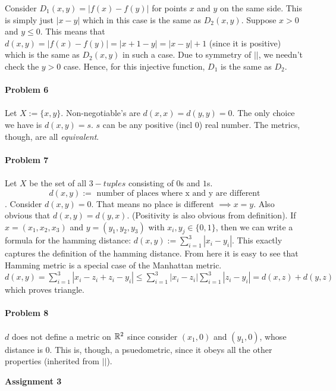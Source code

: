 \documentclass[../Main.tex]{subfiles}
\begin{document}
Consider $D_1(x,y)=|f(x)-f(y)|$ for points $x$ and $y$ on the same side. This is simply just $|x-y|$ which in this case is the same as $D_2(x,y)$. Suppose $x>0$ and $y\leq 0$. This means that $d(x,y)=|f(x)-f(y)|=|x+1-y|=|x-y|+1$ (since it is positive) which is the same as $D_2(x,y)$ in such a case. Due to symmetry of $||$, we needn't check the $y>0$ case. Hence, for this injective function, $D_1$ is the same as $D_2$.
\\\\ \textbf{Problem 6}
\\\\ Let $X:=\{x,y\}$. Non-negotiable's are $d(x,x)=d(y,y)=0$. The only choice we have is $d(x,y)=s$. $s$ can be any positive (incl $0$) real number. The metrics, though, are all \emph{equivalent}.
\\\\ \textbf{Problem 7}
\\\\ Let $X$ be the set of all $3-tuples$ consisting of $0$s and $1$s. $$d(x,y):=\text{ number of places where x and y are different}$$. Consider $d(x,y)=0$. That means no place is different $\implies x=y$. Also obvious that $d(x,y)=d(y,x)$. (Positivity is also obvious from definition). If $x=(x_1,x_2,x_3)$ and $y=(y_1,y_2,y_3)$ with $x_i,y_j\in\{0,1\}$, then we can write a formula for the hamming distance: $d(x,y):= \sum_{i=1}^{3}|x_i-y_i|$. This exactly captures the definition of the hamming distance. From here it is easy to see that Hamming metric is a special case of the Manhattan metric. $d(x,y)=\sum_{i=1}^3|x_i-z_i+z_i-y_i|\leq \sum_{i=1}^3|x_i-z_i| \sum_{i=1}^3 |z_i-y_i|=d(x,z)+d(y,z)$ which proves triangle.
\\\\ \textbf{Problem 8}
\\\\ $d$ does not define a metric on $\mathbb R^2$ since consider $(x_1,0)$ and $(y_1,0)$, whose distance is $0$. This is, though, a psuedometric, since it obeys all the other properties (inherited from $||$).

\begin{center}
    \textbf{Assignment 3}
\end{center}
\end{document}
